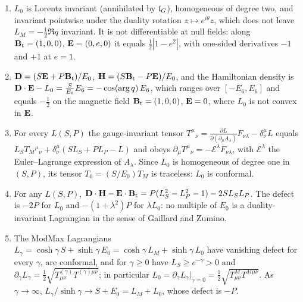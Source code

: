 \begin{theorem}
\label{r1:thm:L0}
\begin{enumerate}[label=(\roman*),leftmargin=2.2em]
\item $L_0$ is Lorentz invariant (annihilated by $\mathfrak l_G$), homogeneous of degree two, and invariant pointwise under the duality rotation
$z\mapsto e^{i\theta}z$, which does not leave $L_M=-\tfrac12\Re q$ invariant. It is not differentiable at null fields: along
$\mathbf B_{\rm t}=(1,0,0)$, $\mathbf E=(0,e,0)$ it equals $\tfrac12|1-e^2|$, with one-sided derivatives $-1$ and $+1$ at $e=1$.
\item $\mathbf D=(S\mathbf E+P\mathbf B_{\rm t})/E_0$, $\mathbf H=(S\mathbf B_{\rm t}-P\mathbf E)/E_0$, and the Hamiltonian density is
$\mathbf D\cdot\mathbf E-L_0=\tfrac S{E_0}E_6=-\cos(\arg q)\,E_6$, which ranges over $[-E_6,E_6]$ and equals $-\tfrac12$ on the magnetic field
$\mathbf B_{\rm t}=(1,0,0)$, $\mathbf E=0$, where $L_0$ is not convex in $\mathbf E$.
\item For every $L(S,P)$ the gauge-invariant tensor $T^\mu{}_\nu=\frac{\partial L}{\partial(\partial_\mu A_\lambda)}F_{\nu\lambda}-\delta^\mu_\nu L$
equals $L_ST_M{}^\mu{}_\nu+\delta^\mu_\nu(SL_S+PL_P-L)$ and obeys $\partial_\mu T^\mu{}_\nu=-\mathcal E^\lambda F_{\nu\lambda}$, with
$\mathcal E^\lambda$ the Euler--Lagrange expression of $A_\lambda$. Since $L_0$ is homogeneous of degree one in $(S,P)$, its tensor
$T_0=(S/E_0)T_M$ is traceless: $L_0$ is conformal.
\item For any $L(S,P)$, $\mathbf D\cdot\mathbf H-\mathbf E\cdot\mathbf B_{\rm t}=P(L_S^2-L_P^2-1)-2SL_SL_P$. The defect is $-2P$ for $L_0$ and
$-(1+\lambda^2)P$ for $\lambda L_0$: no multiple of $E_0$ is a duality-invariant Lagrangian in the sense of Gaillard and Zumino.
\item The ModMax Lagrangians $L_\gamma=\cosh\gamma\,S+\sinh\gamma\,E_0=\cosh\gamma\,L_M+\sinh\gamma\,L_0$ have vanishing defect for every
$\gamma$, are conformal, and for $\gamma\ge0$ have $L_S\ge e^{-\gamma}>0$ and $\partial_\gamma L_\gamma=\tfrac12\sqrt{T^{(\gamma)}_{\mu\nu}T^{(\gamma)\mu\nu}}$;
in particular $L_0=\partial_\gamma L_\gamma|_{\gamma=0}=\tfrac12\sqrt{T^M_{\mu\nu}T^{M\mu\nu}}$. As $\gamma\to\infty$,
$L_\gamma/\sinh\gamma\to S+E_0=L_M+L_0$, whose defect is $-P$.
\end{enumerate}
\end{theorem}

